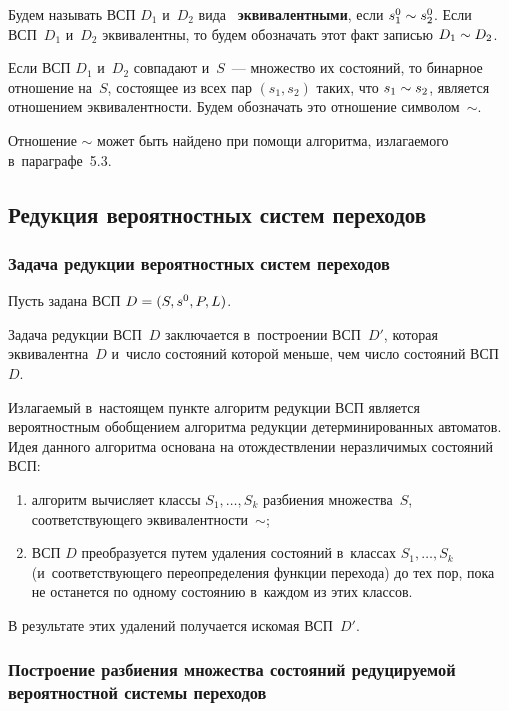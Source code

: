 \begin{multicols}{2}
Будем называть ВСП $D_1$ и~$D_2$ вида~ {\bf эквивалентными},
если $s^0_1\hm\sim s^0_2$. Если ВСП~$D_1$ и~$D_2$ эквивалентны,
то будем обозначать этот факт записью $D_1\hm\sim D_2$.

Если ВСП $D_1$ и~$D_2$ совпадают и~$S$~--- множество их состояний, то
бинарное отношение на~$S$, состоящее из всех пар $(s_1, s_2)$
таких, что $s_1\hm\sim s_2$, является отношением эквивалентности.
Будем обозначать это отношение символом~$\sim$.

Отношение $\sim$ может быть найдено при помощи алгоритма, излагаемого
в~параграфе~5.3.

\vspace*{-4pt}

\subsection{Редукция вероятностных систем переходов}

\vspace*{-2pt}

\subsubsection{Задача редукции вероятностных систем переходов}

Пусть задана ВСП $D\hm=(S, s^0, P,L)$.

Задача редукции ВСП~$D$ заключается в~построении ВСП~$D'$,
которая эквивалентна~$D$ и~чис\-ло состояний которой меньше, чем
чис\-ло состояний ВСП~$D$.

Излагаемый в~настоящем пункте алгоритм редукции ВСП является
вероятностным обобщением алгоритма редукции детерминированных
автоматов. Идея данного алгоритма основана на отож\-де\-ст\-вле\-нии
неразличимых состояний ВСП:
\begin{enumerate}[(1)]
\item алгоритм вычисляет классы $S_1, \ldots, S_k$ разбиения множества~$S$,
соответствующего эквивалентности~$\sim$;
\item  ВСП $D$ преобразуется путем удаления
состояний в~классах $S_1, \ldots, S_k$ (и~соответствующего
переопределения функции перехода) до тех пор, пока не останется по
одному состоянию в~каждом из этих классов.
\end{enumerate}
В результате этих удалений получается искомая ВСП~$D'$.

\subsubsection{Построение разбиения множества состояний редуцируемой вероятностной системы переходов}
\label{sdfagdsagdsfgdsfgds44455}


\end{multicols}
